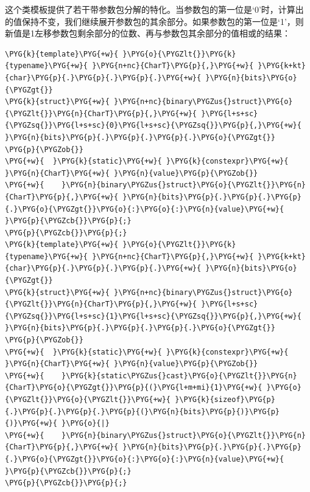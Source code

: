 
这个类模板提供了若干带参数包分解的特化。当参数包的第一位是‘0’时，计算出的值保持不变，我们继续展开参数包的其余部分。如果参数包的第一位是‘1’，则新值是1左移参数包剩余部分的位数、再与参数包其余部分的值相或的结果：



\begin{codeblockbg}
\begin{Verbatim}[commandchars=\\\{\},breaklines=true,breakanywhere=true,fontsize=\codefont,xleftmargin=17bp]
\PYG{k}{template}\PYG{+w}{ }\PYG{o}{\PYGZlt{}}\PYG{k}{typename}\PYG{+w}{ }\PYG{n+nc}{CharT}\PYG{p}{,}\PYG{+w}{ }\PYG{k+kt}{char}\PYG{p}{.}\PYG{p}{.}\PYG{p}{.}\PYG{+w}{ }\PYG{n}{bits}\PYG{o}{\PYGZgt{}}
\PYG{k}{struct}\PYG{+w}{ }\PYG{n+nc}{binary\PYGZus{}struct}\PYG{o}{\PYGZlt{}}\PYG{n}{CharT}\PYG{p}{,}\PYG{+w}{ }\PYG{l+s+sc}{\PYGZsq{}}\PYG{l+s+sc}{0}\PYG{l+s+sc}{\PYGZsq{}}\PYG{p}{,}\PYG{+w}{ }\PYG{n}{bits}\PYG{p}{.}\PYG{p}{.}\PYG{p}{.}\PYG{o}{\PYGZgt{}}
\PYG{p}{\PYGZob{}}
\PYG{+w}{  }\PYG{k}{static}\PYG{+w}{ }\PYG{k}{constexpr}\PYG{+w}{ }\PYG{n}{CharT}\PYG{+w}{ }\PYG{n}{value}\PYG{p}{\PYGZob{}}
\PYG{+w}{    }\PYG{n}{binary\PYGZus{}struct}\PYG{o}{\PYGZlt{}}\PYG{n}{CharT}\PYG{p}{,}\PYG{+w}{ }\PYG{n}{bits}\PYG{p}{.}\PYG{p}{.}\PYG{p}{.}\PYG{o}{\PYGZgt{}}\PYG{o}{:}\PYG{o}{:}\PYG{n}{value}\PYG{+w}{ }\PYG{p}{\PYGZcb{}}\PYG{p}{;}
\PYG{p}{\PYGZcb{}}\PYG{p}{;}
\PYG{k}{template}\PYG{+w}{ }\PYG{o}{\PYGZlt{}}\PYG{k}{typename}\PYG{+w}{ }\PYG{n+nc}{CharT}\PYG{p}{,}\PYG{+w}{ }\PYG{k+kt}{char}\PYG{p}{.}\PYG{p}{.}\PYG{p}{.}\PYG{+w}{ }\PYG{n}{bits}\PYG{o}{\PYGZgt{}}
\PYG{k}{struct}\PYG{+w}{ }\PYG{n+nc}{binary\PYGZus{}struct}\PYG{o}{\PYGZlt{}}\PYG{n}{CharT}\PYG{p}{,}\PYG{+w}{ }\PYG{l+s+sc}{\PYGZsq{}}\PYG{l+s+sc}{1}\PYG{l+s+sc}{\PYGZsq{}}\PYG{p}{,}\PYG{+w}{ }\PYG{n}{bits}\PYG{p}{.}\PYG{p}{.}\PYG{p}{.}\PYG{o}{\PYGZgt{}}
\PYG{p}{\PYGZob{}}
\PYG{+w}{  }\PYG{k}{static}\PYG{+w}{ }\PYG{k}{constexpr}\PYG{+w}{ }\PYG{n}{CharT}\PYG{+w}{ }\PYG{n}{value}\PYG{p}{\PYGZob{}}
\PYG{+w}{    }\PYG{k}{static\PYGZus{}cast}\PYG{o}{\PYGZlt{}}\PYG{n}{CharT}\PYG{o}{\PYGZgt{}}\PYG{p}{(}\PYG{l+m+mi}{1}\PYG{+w}{ }\PYG{o}{\PYGZlt{}}\PYG{o}{\PYGZlt{}}\PYG{+w}{ }\PYG{k}{sizeof}\PYG{p}{.}\PYG{p}{.}\PYG{p}{.}\PYG{p}{(}\PYG{n}{bits}\PYG{p}{)}\PYG{p}{)}\PYG{+w}{ }\PYG{o}{|}
\PYG{+w}{    }\PYG{n}{binary\PYGZus{}struct}\PYG{o}{\PYGZlt{}}\PYG{n}{CharT}\PYG{p}{,}\PYG{+w}{ }\PYG{n}{bits}\PYG{p}{.}\PYG{p}{.}\PYG{p}{.}\PYG{o}{\PYGZgt{}}\PYG{o}{:}\PYG{o}{:}\PYG{n}{value}\PYG{+w}{ }\PYG{p}{\PYGZcb{}}\PYG{p}{;}
\PYG{p}{\PYGZcb{}}\PYG{p}{;}
\end{Verbatim}
\end{codeblockbg}


